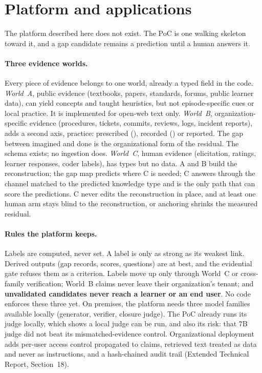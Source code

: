 \section{Platform and applications}\label{sec:platform}

\evfut{} The platform described here does not exist. The PoC is one walking skeleton toward it, and a
gap candidate remains a prediction until a human answers it.

\paragraph{Three evidence worlds.} Every piece of evidence belongs to one world, already a typed field
in the code. \emph{World~A}, public evidence (textbooks, papers, standards, forums, public learner
data), can yield concepts and taught heuristics, but not episode-specific cues or local practice.
\evobs{} It is implemented for open-web text only. \emph{World~B}, organization-specific evidence
(procedures, tickets, commits, reviews, logs, incident reports), adds a second axis, practice:
prescribed (), recorded () or reported. \evhyp{} The gap between imagined and
done is the organizational form of the residual. \evobs{} The schema exists; no ingestion does.
\emph{World~C}, human evidence (elicitation, ratings, learner responses, coder labels), has types but no
data. \evfut{} A and B build the reconstruction; the gap map predicts where C is needed; C answers through
the channel matched to the predicted knowledge type and is the only path that can score the predictions.
C never edits the reconstruction in place, and at least one human arm stays blind to the reconstruction,
or anchoring shrinks the measured residual.

\paragraph{Rules the platform keeps.} \evobs{} Labels are computed, never set. A label is only as strong
as its weakest link. Derived outputs (gap records, scores, questions) are  at best, and the
evidential gate refuses them as a criterion. \evfut{} Labels move up only through World~C or
cross-family verification; World~B claims never leave their organization's tenant; and
\textbf{unvalidated candidates never reach a learner or an end user}. No code enforces these three yet.
On premises, the platform needs three model families available locally (generator, verifier, closure
judge). \evobs{} The PoC already runs its judge locally, which shows a local judge can be run, and also its risk: that 7B judge did not beat its mismatched-evidence control. Organizational deployment adds per-user access control
propagated to claims, retrieved text treated as data and never as instructions, and a hash-chained audit
trail (Extended Technical Report, Section~18).

